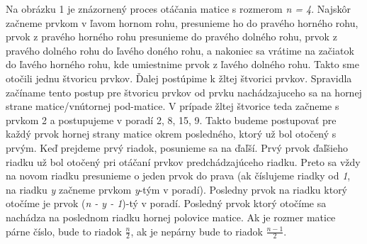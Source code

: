 \documentclass{article}
\begin{document}
Na obrázku 1 je znázornený proces otáčania matice s rozmerom \textit{n = 4}. Najskôr začneme prvkom v ľavom hornom rohu, presunieme ho do pravého horného rohu, prvok z pravého horného rohu presunieme do pravého dolného rohu, prvok z pravého dolného rohu do ľavého doného rohu, a nakoniec sa vrátime na začiatok do ľavého horného rohu, kde umiestnime prvok z ľavého dolného rohu. Takto sme otočili jednu štvoricu prvkov. Ďalej postúpime k žltej štvorici prvkov. Spravidla začíname tento postup pre štvoricu prvkov od prvku nachádzajuceho sa na hornej strane matice/vnútornej pod-matice. V prípade žltej štvorice teda začneme s prvkom 2 a postupujeme v poradí 2, 8, 15, 9. Takto budeme postupovať pre každý prvok hornej strany matice okrem posledného, ktorý už bol otočený s prvým. Keď prejdeme prvý riadok, posunieme sa na ďaľší. Prvý prvok ďaľšieho riadku už bol otočený pri otáčaní prvkov predchádzajúceho riadku. Preto sa vždy na novom riadku presunieme o jeden prvok do prava (ak číslujeme riadky od \textit{1}, na riadku \textit{y} začneme prvkom \textit{y}-tým v poradí). Posledny prvok na riadku ktorý otočíme je prvok (\textit{n - y - 1})-tý v poradí. Posledný prvok ktorý otočíme sa nachádza na poslednom riadku hornej polovice matice. Ak je rozmer matice párne číslo, bude to riadok $\frac{n}{2}$, ak je nepárny bude to riadok $\frac{n - 1}{2}$.
\end{document}
